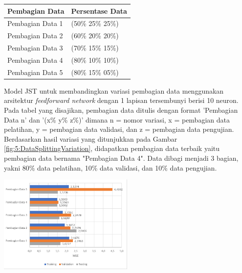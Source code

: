 \documentclass[a4paper,10pt]{article}
\makeatletter
\newenvironment{body}{\begin{multicols}{2}}{\end{multicols}}
\renewenvironment{table}
{\def\@captype{table}%
	\captionsetup{format=plain,labelsep=newline,font=footnotesize,textfont=sc,justification=centering}%
	\fontsize{8}{8}\selectfont
}
{}
\renewenvironment{figure}
{\def\@captype{figure}%
	\captionsetup{labelsep=period,format=hang,font=footnotesize,justification=justified}
}
{}
\makeatother
\begin{document}
\begin{body}
		\begin{table}
			\centering
			\caption{Tabel Daftar Variasi Pembagian Data}
			\label{tbl:5:NeuronVariation}
			\begin{tabularx}{\linewidth}{XX}\toprule
				\textbf{Pembagian Data} & \textbf{Persentase Data} \\ \toprule
				Pembagian Data 1 & (50\% 25\% 25\%) \\ \midrule
				Pembagian Data 2 & (60\% 20\% 20\%) \\ \midrule
				Pembagian Data 3 & (70\% 15\% 15\%) \\ \midrule
				Pembagian Data 4 & (80\% 10\% 10\%) \\ \midrule
				Pembagian Data 5 & (80\% 15\% 05\%) \\ \bottomrule
			\end{tabularx}
		\end{table}
		\vspace{1em}
		
		Model JST untuk membandingkan variasi pembagian data menggunakan arsitektur \textit{feedforward network} dengan 1 lapisan tersembunyi berisi 10 neuron. Pada tabel yang disajikan, pembagian data ditulis dengan format ’Pembagian Data n’ dan ’(x\% y\% z\%)’ dimana n = nomor variasi, x = pembagian data pelatihan, y = pembagian data validasi, dan z = pembagian data pengujian. Berdasarkan hasil variasi yang ditunjukkan pada Gambar \ref{fig:5:DataSplittingVariation}, didapatkan pembagian data terbaik yaitu pembagian data bernama "Pembagian Data 4". Data dibagi menjadi 3 bagian, yakni 80\% data pelatihan, 10\% data validasi, dan 10\% data pengujian.\\
		
		\begin{figure}
			\centering
			\includegraphics[width=0.5\textwidth]{figures/VariasiPembagianDataJSTKontroler}
			\caption{Grafik Variasi Pembagian Data}
			\label{fig:5:DataSplittingVariation}
		\end{figure}
	
		\vspace{3mm}
		

\end{body}
\end{document}
